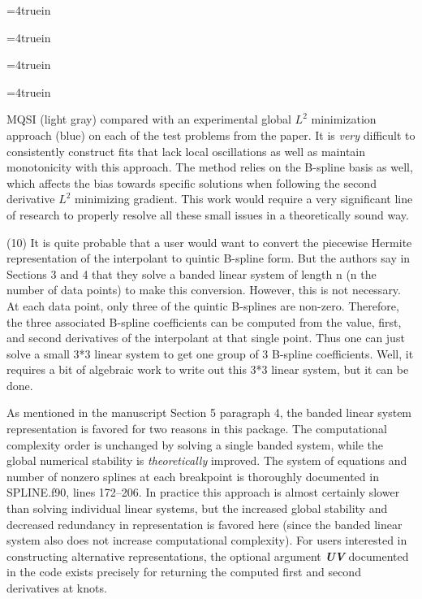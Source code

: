 \centerline{\epsfxsize=4truein }
\centerline{\epsfxsize=4truein }
\centerline{\epsfxsize=4truein }
\centerline{\epsfxsize=4truein }
{\narrower{}
{\ttVIII MQSI} (light gray) compared with an experimental global $L^2$
minimization approach (blue) on each of the test problems from the
paper. It is {\it very} difficult to consistently construct fits that
lack local oscillations as well as maintain monotonicity with this
approach. The method relies on the B-spline basis as well, which
affects the bias towards specific solutions when following the second
derivative $L^2$ minimizing gradient.  This work would require a very
significant line of research to properly resolve all these small
issues in a theoretically sound way.
\par}
\vfill \eject


\goodbreak
{\parindent=20pt \it
  
\item{(10)} It is quite probable that a user would want to convert the
  piecewise Hermite representation of the interpolant to quintic
  B-spline form. But the authors say in Sections 3 and 4 that they
  solve a banded linear system of length n (n the number of data
  points) to make this conversion. However, this is not necessary. At
  each data point, only three of the quintic B-splines are
  non-zero. Therefore, the three associated B-spline coefficients can
  be computed from the value, first, and second derivatives of the
  interpolant at that single point. Thus one can just solve a small
  3*3 linear system to get one group of 3 B-spline coefficients. Well,
  it requires a bit of algebraic work to write out this 3*3 linear
  system, but it can be done.

}

As mentioned in the manuscript Section 5 paragraph 4, the banded
linear system representation is favored for two reasons in this
package. The computational complexity order is unchanged by solving a
single banded system, while the global numerical stability is {\it
  theoretically} improved. The system of equations and number of
nonzero splines at each breakpoint is thoroughly documented in
{\ttVIII SPLINE.f90}, lines 172--206. In practice this approach is
almost certainly slower than solving individual linear systems, but
the increased global stability and decreased redundancy in
representation is favored here (since the banded linear system also
does not increase computational complexity). For users interested in
constructing alternative representations, the optional argument {\it
  \bf UV} documented in the code exists precisely for returning the
computed first and second derivatives at knots.


